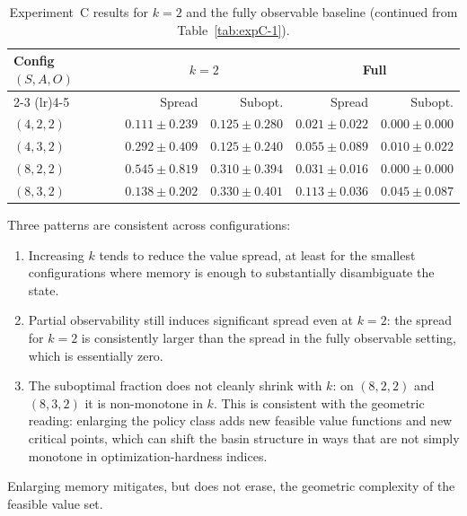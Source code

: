 \documentclass{article}
\theoremstyle{definition}
\theoremstyle{remark}
\begin{document}
\begin{table}[h]
  \caption{Experiment~C results for $k=2$ and the fully observable baseline (continued from Table~\ref{tab:expC-1}).}
  \centering
  \small
  \renewcommand{\arraystretch}{1.15}
  \begin{tabular}{@{}lrrrr@{}}
    \toprule
    Config $(S,A,O)$
      & \multicolumn{2}{c}{$k=2$}
      & \multicolumn{2}{c}{Full} \\
    \cmidrule(lr){2-3}
    \cmidrule(lr){4-5}
    & Spread & Subopt.
      & Spread & Subopt. \\
    \midrule
    $(4,2,2)$ & $0.111 \pm 0.239$ & $0.125 \pm 0.280$ & $0.021 \pm 0.022$ & $0.000 \pm 0.000$ \\
    $(4,3,2)$ & $0.292 \pm 0.409$ & $0.125 \pm 0.240$ & $0.055 \pm 0.089$ & $0.010 \pm 0.022$ \\
    $(8,2,2)$ & $0.545 \pm 0.819$ & $0.310 \pm 0.394$ & $0.031 \pm 0.016$ & $0.000 \pm 0.000$ \\
    $(8,3,2)$ & $0.138 \pm 0.202$ & $0.330 \pm 0.401$ & $0.113 \pm 0.036$ & $0.045 \pm 0.087$ \\
    \bottomrule
  \end{tabular}
  \label{tab:expC-2}
\end{table}

Three patterns are consistent across configurations:
 
\begin{enumerate}
  \item Increasing $k$ tends to reduce the value spread, at least for the smallest configurations where memory is enough to substantially disambiguate the state.
 
  \item Partial observability still induces significant spread even at $k = 2$: the spread for $k = 2$ is consistently larger than the spread in the fully observable setting, which is essentially zero.
 
  \item The suboptimal fraction does not cleanly shrink with $k$: on $(8,2,2)$ and $(8,3,2)$ it is non-monotone in $k$. This is consistent with the geometric reading: enlarging the policy class adds new feasible value functions and new critical points, which can shift the basin structure in ways that are not simply monotone in optimization-hardness indices.
\end{enumerate}
 
Enlarging memory mitigates, but does not erase, the geometric complexity of the feasible value set.
\end{document}
